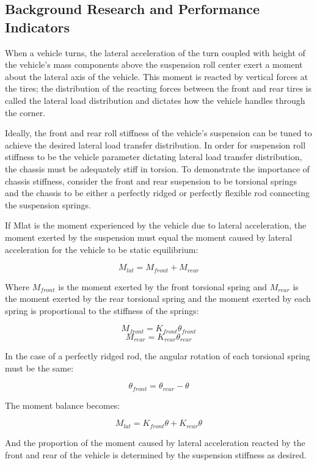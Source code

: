\documentclass[a4paper]{article}
\numberwithin{equation}{section}
\begin{document}
\subsection{Background Research and Performance Indicators} \label{Background Research and Performance Indicators}
When a vehicle turns, the lateral acceleration of the turn coupled with height of the vehicle’s mass components above the suspension roll center exert a moment about the lateral axis of the vehicle. This moment is reacted by vertical forces at the tires; the distribution of the reacting forces between the front and rear tires is called the lateral load distribution and dictates how the vehicle handles through the corner.

Ideally, the front and rear roll stiffness of the vehicle’s suspension can be tuned to achieve the desired lateral load transfer distribution. In order for suspension roll stiffness to be the vehicle parameter dictating lateral load transfer distribution, the chassis must be adequately stiff in torsion. To demonstrate the importance of chassis stiffness, consider the front and rear suspension to be torsional springs and the chassis to be either a perfectly ridged or perfectly flexible rod connecting the suspension springs. 

If Mlat is the moment experienced by the vehicle due to lateral acceleration, the moment exerted by the suspension must equal the moment caused by lateral acceleration for the vehicle to be static equilibrium:

$$M_{lat} = M_{front} + M_{rear}$$

Where $M_{front}$ is the moment exerted by the front torsional spring and $M_{rear}$ is the moment exerted by the rear torsional spring and the moment exerted by each spring is proportional to the stiffness of the springs:

$$M_{front} = K_{front}\theta_{front}$$
$$M_{rear} = K_{rear}\theta_{rear}$$

In the case of a perfectly ridged rod, the angular rotation of each torsional spring must be the same:

$$\theta_{front} = \theta_{rear}-\theta$$

The moment balance becomes:

$$M_{lat} = K_{front}\theta + K_{rear}\theta$$

And the proportion of the moment caused by lateral acceleration reacted by the front and rear of the vehicle is determined by the suspension stiffness as desired.
\end{document}

